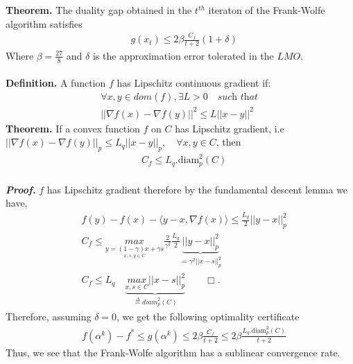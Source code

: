 \documentclass{article}
\begin{document}
\\
\\
\textbf{Theorem.} The duality gap obtained in the $t^{th}$  iteraton of the Frank-Wolfe algorithm satisfies
\begin{equation*}
\begin{aligned}
    &g(x_{t})\leq 2\beta\frac{C_{f}}{t+2}(1+\delta)
\end{aligned}
\end{equation*}
Where $\beta= \frac{27}{8}$ and $\delta$ is the approximation error tolerated in the $LMO$.
\\
\\
\textbf{Definition.} A function $f$ has Lipschitz continuous gradient if: 
\begin{equation*}
\begin{aligned}
    &\forall x,y \in dom(f), \exists L >0 \quad\textit{such that}\quad\\
    &||\nabla f(x) -\nabla f(y)||^2 \leq L||x - y||^2
\end{aligned}
\end{equation*}
\textbf{Theorem.} If a convex function $f$ on $C$ has Lipschitz gradient, i.e $||\nabla f(x)- \nabla f(y)||_{p}\leq L_{q}||x- y||_{p},\quad\forall x,y\in C$, then
\begin{equation*}
\begin{aligned}
      &C_{f}\leq L_{q}.\text{diam}_{p}^{2}(C)
\end{aligned}
\end{equation*}
\\
\textbf{\textit{Proof.}} $f$ has Lipschitz gradient therefore by the fundamental descent lemma we have,
\begin{equation*}
\begin{aligned}
      &f(y)- f(x)- \langle y- x, \nabla f(x)\rangle \leq \frac{L_{q}}{2}||y- x||_{p}^{2}\\
      &C_{f} \leq \underset{\underset{x,s,y\in C}{y=(1-\gamma)x+\gamma s}}{max}\frac{2}{\gamma^{2}}\frac{L_{q}}{2}\underbrace{||y- x||_{p}^{2}}_{=\gamma^{2}||x- s||_{p}^{2}}\\
      &C_{f} \leq L_{q}\quad\underbrace{\underset{x,s\in C}{max}||x- s||_{p}^{2}}_{\overset{\Delta}{=}\textit{diam}_{p}^{2}(C)}\quad\quad\Box.
\end{aligned}    
\end{equation*}
Therefore, assuming $\delta=0$, we get the following optimality certificate
\begin{equation*}
\begin{aligned}
      &f(\alpha^{k})- f^{*}\leq  g(\alpha^{k})\leq 2\beta\frac{C_{f}}{t+2}\leq 2\beta\frac{L_{q}.\text{diam}_{p}^{2}(C)}{t+2}
\end{aligned}    
\end{equation*}
Thus, we see that the Frank-Wolfe algorithm has a sublinear convergence rate.
\end{document}

